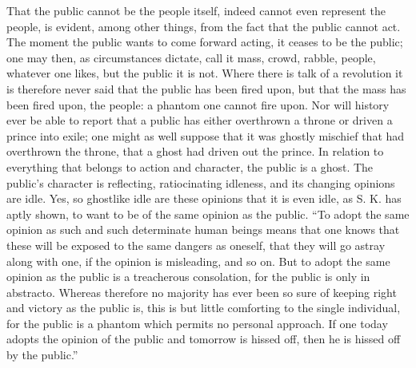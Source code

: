 \documentclass[12pt,a4paper,openany]{book}
\newcommand{\opage}[1]{\marginnote{\footnotesize\textit{[#1]}}}
\begin{document}
That the public cannot be the people itself, indeed cannot even
\setcounter{footnote}{0}%
\opage{15}represent the people, is evident, among other things, from the fact
that the public cannot act. The moment the public
wants to come forward acting, it ceases to be the public;
one may then, as circumstances dictate, call it mass,
crowd, rabble, people, whatever one likes, but the public it
is not. Where there is talk of a revolution it
is therefore never said that the public has been fired upon, but
that the mass has been fired upon, the people: a phantom
one cannot fire upon. Nor will history ever
be able to report that a public has either
overthrown a throne or driven a prince into exile;
one might as well suppose that it was ghostly mischief that
had overthrown the throne, that a ghost had driven out
the prince. In relation to everything that belongs to action
and character, the public is a ghost. The public's
character is reflecting, ratiocinating idleness,
and its changing opinions are idle. Yes, so ghostlike
idle are these opinions that it is even idle, as S. K.
has aptly shown, to want to be of the same
opinion as the public. ``To adopt the same opinion as
such and such determinate human beings means that one
knows that these will be exposed to the same dangers as
oneself, that they will go astray along with one, if the opinion
is misleading, and so on. But to adopt the same opinion
as the public is a treacherous consolation, for the public is
only in abstracto. Whereas therefore no majority
has ever been so sure of keeping right
and victory as the public is, this is but little
comforting to the single individual, for the public is a phantom
which permits no personal approach. If
\setcounter{footnote}{0}%
\opage{16}one today adopts the opinion of the public and tomorrow is
hissed off, then he is hissed off by the public.''
\end{document}
